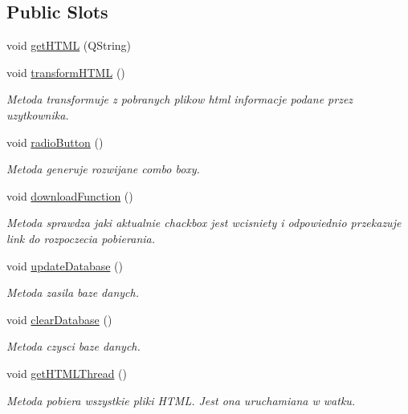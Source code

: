 \subsection*{Public Slots}
\begin{DoxyCompactItemize}
\item 
void \mbox{\hyperlink{class_vubu_etl_project_a0ec762e8da4850d4df4a9cc4ca853bc0}{get\+H\+T\+ML}} (Q\+String)
\item 
void \mbox{\hyperlink{class_vubu_etl_project_a96a0529f088b16f27bb5caf4613be354}{transform\+H\+T\+ML}} ()
\begin{DoxyCompactList}\small\item\em Metoda transformuje z pobranych plikow html informacje podane przez uzytkownika. \end{DoxyCompactList}\item 
void \mbox{\hyperlink{class_vubu_etl_project_af2e129dffbe49b95921927226f7f3660}{radio\+Button}} ()
\begin{DoxyCompactList}\small\item\em Metoda generuje rozwijane combo boxy. \end{DoxyCompactList}\item 
void \mbox{\hyperlink{class_vubu_etl_project_ae737e131ae6ce3de41151ac665e6e0d5}{download\+Function}} ()
\begin{DoxyCompactList}\small\item\em Metoda sprawdza jaki aktualnie chackbox jest wcisniety i odpowiednio przekazuje link do rozpoczecia pobierania. \end{DoxyCompactList}\item 
void \mbox{\hyperlink{class_vubu_etl_project_a3079e407acd405007d64fddf84b6f0e6}{update\+Database}} ()
\begin{DoxyCompactList}\small\item\em Metoda zasila baze danych. \end{DoxyCompactList}\item 
void \mbox{\hyperlink{class_vubu_etl_project_a767b72fe3e958c20bb2aa0e11a702f0f}{clear\+Database}} ()
\begin{DoxyCompactList}\small\item\em Metoda czysci baze danych. \end{DoxyCompactList}\item 
void \mbox{\hyperlink{class_vubu_etl_project_af15be1aa31f4d30e0b8c14495848fe49}{get\+H\+T\+M\+L\+Thread}} ()
\begin{DoxyCompactList}\small\item\em Metoda pobiera wszystkie pliki H\+T\+ML. Jest ona uruchamiana w watku. \end{DoxyCompactList}\item 

\end{DoxyCompactItemize}
